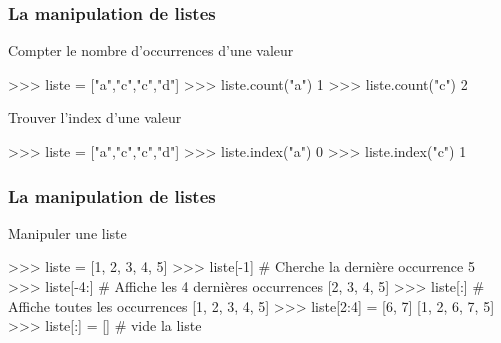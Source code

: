 \begin{frame}[fragile]
\frametitle{La manipulation de listes}

\begin{minipage}[t]{0.38\linewidth}
Compter le nombre d'occurrences d'une valeur
\end{minipage}\hfill
\begin{minipage}[t]{0.58\linewidth}
\vspace{-0.5cm}
\begin{GrayBox}[0.85\textwidth]
\begin{verbatimtab}[3]
>>> liste = ["a","c","c","d"]
>>> liste.count("a")
1
>>> liste.count("c")
2
\end{verbatimtab}
\end{GrayBox}
\end{minipage}

\begin{minipage}[t]{0.38\linewidth}
Trouver l'index d'une valeur
\end{minipage}\hfill
\begin{minipage}[t]{0.58\linewidth}
\vspace{-0.5cm}
\begin{GrayBox}[0.85\textwidth]
\begin{verbatimtab}[3]
>>> liste = ["a","c","c","d"]
>>> liste.index("a")
0
>>> liste.index("c")
1
\end{verbatimtab}
\end{GrayBox}
\end{minipage}
\end{frame}

\begin{frame}[fragile]
\frametitle{La manipulation de listes}

Manipuler une liste

\begin{GrayBox}[0.8\textwidth]
\begin{verbatimtab}[3]
>>> liste = [1, 2, 3, 4, 5]
>>> liste[-1] # Cherche la dernière occurrence
5
>>> liste[-4:] # Affiche les 4 dernières occurrences
[2, 3, 4, 5]
>>> liste[:] # Affiche toutes les occurrences
[1, 2, 3, 4, 5]
>>> liste[2:4] = [6, 7]
[1, 2, 6, 7, 5]
>>> liste[:] = [] # vide la liste
\end{verbatimtab}
\end{GrayBox}
\end{frame}

